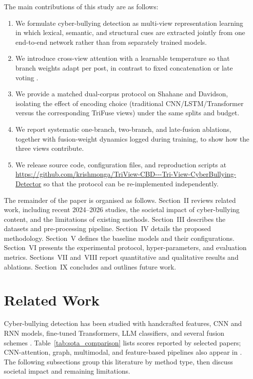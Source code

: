 \documentclass[journal]{IEEEtran}
\begin{document}
The main contributions of this study are as follows:
\begin{enumerate}
\item We formulate cyber-bullying detection as multi-view representation learning in which lexical, semantic, and structural cues are extracted jointly from one end-to-end network rather than from separately trained models.
\item We introduce cross-view attention with a learnable temperature so that branch weights adapt per post, in contrast to fixed concatenation or late voting \cite{ref14}.
\item We provide a matched dual-corpus protocol on Shahane and Davidson, isolating the effect of encoding choice (traditional CNN/LSTM/Transformer versus the corresponding TriFuse views) under the same splits and budget.
\item We report systematic one-branch, two-branch, and late-fusion ablations, together with fusion-weight dynamics logged during training, to show how the three views contribute.
\item We release source code, configuration files, and reproduction scripts at \url{https://github.com/krishmonga/TriView-CBD---Tri-View-CyberBullying-Detector} so that the protocol can be re-implemented independently.
\end{enumerate}

The remainder of the paper is organised as follows. Section~II reviews related work, including recent 2024--2026 studies, the societal impact of cyber-bullying content, and the limitations of existing methods. Section~III describes the datasets and pre-processing pipeline. Section~IV details the proposed methodology. Section~V defines the baseline models and their configurations. Section~VI presents the experimental protocol, hyper-parameters, and evaluation metrics. Sections~VII and~VIII report quantitative and qualitative results and ablations. Section~IX concludes and outlines future work.

\section{Related Work}

Cyber-bullying detection has been studied with handcrafted features, CNN and RNN models, fine-tuned Transformers, LLM classifiers, and several fusion schemes \cite{ref12,ref13,ref32,ref38}. Table~\ref{tab:sota_comparison} lists scores reported by selected papers; CNN-attention, graph, multimodal, and feature-based pipelines also appear in \cite{ref17,ref26,ref27,ref28,ref29,ref30,ref31,ref35}. The following subsections group this literature by method type, then discuss societal impact and remaining limitations.
\end{document}
